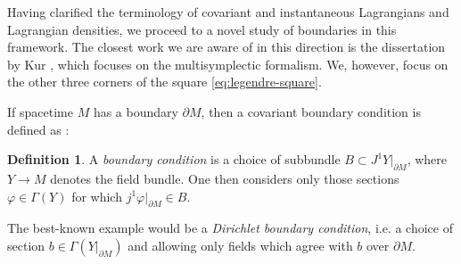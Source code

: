 \documentclass{article}
\theoremstyle{definition}
\newtheorem{definition}{Definition}[section]
\begin{document}
Having clarified the terminology of covariant and instantaneous Lagrangians and Lagrangian densities, we proceed to a novel study of boundaries in this framework. The closest work we are aware of in this direction is the dissertation by Kur \cite{Kur2018MultisymplecticGW}, which focuses on the multisymplectic formalism. We, however, focus on the other three corners of the square \eqref{eq:legendre-square}.

If spacetime $M$ has a boundary $\partial M$, then a covariant boundary condition is defined as \cite{binz}:
\begin{definition}
    A \textit{boundary condition} is a choice of subbundle $B\subset J^1Y|_{\partial M}$, where $Y\to M$ denotes the field bundle. One then considers only those sections $\varphi\in\Gamma(Y)$ for which $j^1\varphi|_{\partial M}\in B$.
\end{definition}
The best-known example would be a \textit{Dirichlet boundary condition}, i.e. a choice of section $b\in \Gamma(Y|_{\partial M})$ and allowing only fields which agree with $b$ over $\partial M$.
\end{document}
